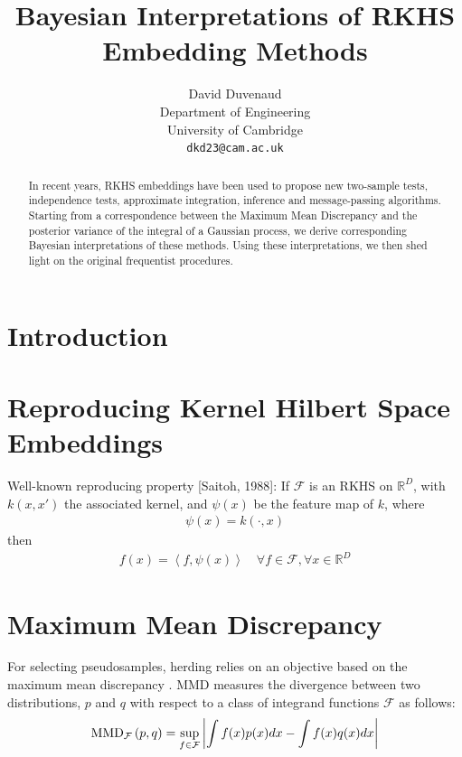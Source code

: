 \documentclass{article} %
\title{Bayesian Interpretations of RKHS Embedding Methods}
\author{
David Duvenaud\\
Department of Engineering\\
University of Cambridge\\
\texttt{dkd23@cam.ac.uk} \\
}
\begin{document}
\maketitle

\begin{abstract}
In recent years, RKHS embeddings have been used to propose new two-sample tests, independence tests, approximate integration, inference and message-passing algorithms.  Starting from a correspondence between the Maximum Mean Discrepancy and the posterior variance of the integral of a Gaussian process, we derive corresponding Bayesian interpretations of these methods.  Using these interpretations, we then shed light on the original frequentist procedures.
\end{abstract}

\section{Introduction}

\section{Reproducing Kernel Hilbert Space Embeddings}

Well-known reproducing property [Saitoh, 1988]:  If $\mathcal{F}$ is an RKHS on $\mathbb{R}^D$, with $k(x,x')$ the associated kernel, and $\psi(x)$ be the feature map of $k$, where
%
\begin{align}
\psi(x) = k(\cdot, x)
\end{align}
then
\begin{align}
f(x) = \left\langle f, \psi(x)\right\rangle \quad \forall f \in \mathcal{F}, \forall x \in \mathbb{R}^D
\end{align}
%


\section{Maximum Mean Discrepancy}

For selecting pseudosamples, herding relies on an objective based on the maximum mean discrepancy \citep{Sriperumbudur2010}. MMD measures the divergence between two distributions, $p$ and $q$ with respect to a class of integrand functions $\mathcal{F}$ as follows:
%
\begin{align}
	{\rm MMD}_{\mathcal{F}}\left(p,q\right) = \sup_{f\in\mathcal{F}}\left\vert\int f(x) p(x) dx - \int f(x) q(x) dx \right\vert
\end{align}
\end{document}
